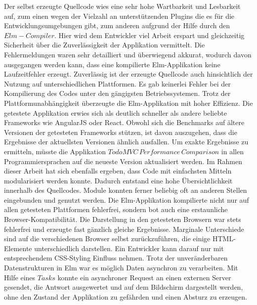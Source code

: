 Der selbst erzeugte Quellcode wies eine sehr hohe Wartbarkeit und Lesbarkeit auf, zum einen wegen der Vielzahl an unterstützenden Plugins die es für die Entwicklungsumgebungen gibt, zum anderen aufgrund der Hilfe durch den $Elm-Compiler$. Hier wird dem Entwickler viel Arbeit erspart und gleichzeitig Sicherheit über die Zuverlässigkeit der Applikation vermittelt. Die Fehlermeldungen waren sehr detailliert und überwiegend akkurat, wodurch davon ausgegangen werden kann, dass eine kompilierte Elm-Applikation keine Laufzeitfehler erzeugt. Zuverlässig ist der erzeugte Quellcode auch hinsichtlich der Nutzung auf unterschiedlichen Plattformen. Es gab keinerlei Fehler bei der Kompilierung des Codes unter den gängigsten Betriebssystemen. Trotz der Plattformunabhängigkeit überzeugte die Elm-Applikation mit hoher Effizienz. Die getestete Applikation erwies sich als deutlich schneller als andere beliebte Frameworks wie AngularJS oder React. Obwohl sich die Benchmarks auf ältere Versionen der getesteten Frameworks stützen, ist davon auszugehen, dass die Ergebnisse der aktuellsten Versionen ähnlich ausfallen. Um exakte Ergebnisse zu ermitteln, müsste die Applikation $TodoMVC\,Performance\,Comparison$ in allen Programmiersprachen auf die neueste Version aktualisiert werden.
Im Rahmen dieser Arbeit hat sich ebenfalls ergeben, dass Code mit einfachsten Mitteln modularisiert werden konnte. Dadurch entstand eine hohe Übersichtlichkeit innerhalb des Quellcodes. Module konnten ferner beliebig oft an anderen Stellen eingebunden und genutzt werden.
Die Elm-Applikation kompilierte nicht nur auf allen getesteten Plattformen fehlerfrei, sondern bot auch eine erstaunliche Browser-Kompatibilität. Die Darstellung in den getesteten Browsern war stets fehlerfrei und erzeugte fast gänzlich gleiche Ergebnisse. Marginale Unterschiede sind auf die verschiedenen Browser selbst zurückzuführen, die einige \ac{HTML}-Elemente unterschiedlich darstellen. Ein Entwickler kann darauf nur mit entsprechendem \ac{CSS}-Styling Einfluss nehmen.
Trotz der unveränderbaren Datenstrukturen in Elm war es möglich Daten asynchron zu verarbeiten. Mit Hilfe eines $Tasks$ konnte ein asynchroner Request an einen externen Server gesendet, die Antwort ausgewertet und auf dem Bildschirm dargestellt werden, ohne den Zustand der Applikation zu gefährden und einen Absturz zu erzeugen.

